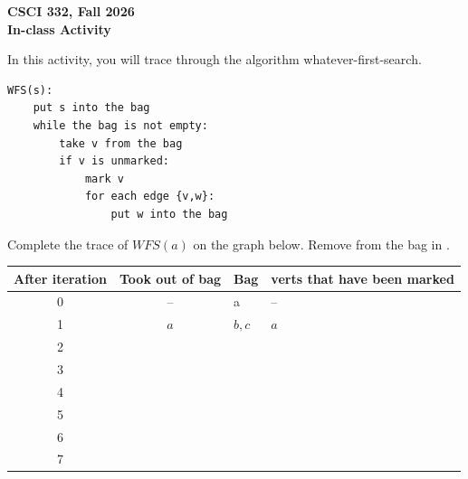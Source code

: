 \documentclass[11pt]{article}
\begin{document}
\begin{center}
\Large\textbf{CSCI 332, Fall 2026}%
\\
\LARGE\textbf{In-class Activity}%
\end{center}

In this activity, you will trace through the algorithm whatever-first-search. 

\begin{verbatim}
WFS(s):
	put s into the bag
	while the bag is not empty:
		take v from the bag
		if v is unmarked:
			mark v
			for each edge {v,w}:
				put w into the bag
\end{verbatim}

Complete the trace of $WFS(a)$ on the graph below. Remove from the bag in .

\begin{center}
\end{center}

\begin{center}
\small
{\renewcommand{\arraystretch}{1.8}
\begin{tabular}{|c|c|p{5.2cm}|p{3.2cm}|}
\hline
After iteration & Took out of bag & Bag & verts that have been marked \\

\hline
0 & -- & a & -- \\ \hline
1 & $a$ & $b,c$ & $a$ \\ \hline
2 & \hspace{.4in} & \hspace{.4in} & \hspace{.4in} \\ \hline
3 & \hspace{.4in} & \hspace{.4in} & \hspace{.4in} \\ \hline
4 & \hspace{.4in} & \hspace{.4in} & \hspace{.4in} \\ \hline
5 & \hspace{.4in} & \hspace{.4in} & \hspace{.4in} \\ \hline
6 & \hspace{.4in} & \hspace{.4in} & \hspace{.4in} \\ \hline
7 & \hspace{.4in} & \hspace{.4in} & \hspace{.4in} \\ \hline
\end{tabular}
}
\end{center}


\end{document}
